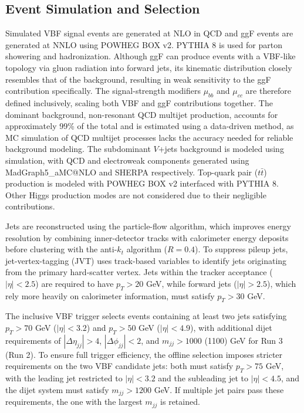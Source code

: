 \subsection{Event Simulation and Selection}

Simulated VBF signal events are generated at NLO in QCD and ggF events are generated at NNLO using POWHEG BOX v2.
PYTHIA 8 is used for parton showering and hadronization. 
Although ggF can produce events with a VBF-like topology via gluon radiation into forward jets, its kinematic distribution closely resembles that of the background, resulting in weak sensitivity to the ggF contribution specifically. 
The signal-strength modifiers $\mu_{bb}$ and $\mu_{cc}$ are therefore defined inclusively, scaling both VBF and ggF contributions together. 
The dominant background, non-resonant QCD multijet production, accounts for approximately 99\% of the total and is estimated using a data-driven method, as MC simulation of QCD multijet processes lacks the accuracy needed for reliable background modeling. 
The subdominant $V$+jets background is modeled using simulation, with QCD and electroweak components generated using MadGraph5\_aMC@NLO and SHERPA respectively. 
Top-quark pair ($t\bar{t}$) production is modeled with POWHEG BOX v2 interfaced with PYTHIA 8. 
Other Higgs production modes are not considered due to their negligible contributions.

Jets are reconstructed using the particle-flow algorithm, which improves energy resolution by combining inner-detector tracks with calorimeter energy deposits before clustering with the anti-$k_t$ algorithm ($R = 0.4$). 
To suppress pileup jets, jet-vertex-tagging (JVT) uses track-based variables to identify jets originating from the primary hard-scatter vertex. 
Jets within the tracker acceptance ($|\eta| < 2.5$) are required to have $p_T > 20$ GeV, while forward jets ($|\eta| > 2.5$), which rely more heavily on calorimeter information, must satisfy $p_T > 30$ GeV.

The inclusive VBF trigger selects events containing at least two jets satisfying $p_T > 70$ GeV ($|\eta| < 3.2$) and $p_T > 50$ GeV ($|\eta| < 4.9$), with additional dijet requirements of $|\Delta\eta_{jj}| > 4$, $|\Delta\phi_{jj}| < 2$, and $m_{jj} > 1000$ (1100) GeV for Run 3 (Run 2). 
To ensure full trigger efficiency, the offline selection imposes stricter requirements on the two VBF candidate jets: both must satisfy $p_T > 75$ GeV, with the leading jet restricted to $|\eta| < 3.2$ and the subleading jet to $|\eta| < 4.5$, and the dijet system must satisfy $m_{jj} > 1200$ GeV. 
If multiple jet pairs pass these requirements, the one with the largest $m_{jj}$ is retained.

